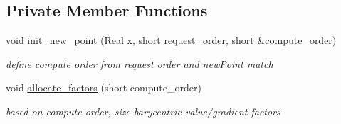 \subsection*{Private Member Functions}
\begin{DoxyCompactItemize}
\item 
void \hyperlink{classPecos_1_1LagrangeInterpPolynomial_aafa5adb96d26d33ef0f61b390d819f66}{init\+\_\+new\+\_\+point} (Real x, short request\+\_\+order, short \&compute\+\_\+order)
\begin{DoxyCompactList}\small\item\em define compute order from request order and new\+Point match \end{DoxyCompactList}\item 
void \hyperlink{classPecos_1_1LagrangeInterpPolynomial_a2a866d84c0640d43946fcde7b0cdd8d6}{allocate\+\_\+factors} (short compute\+\_\+order)
\begin{DoxyCompactList}\small\item\em based on compute order, size barycentric value/gradient factors \end{DoxyCompactList}\end{DoxyCompactItemize}
